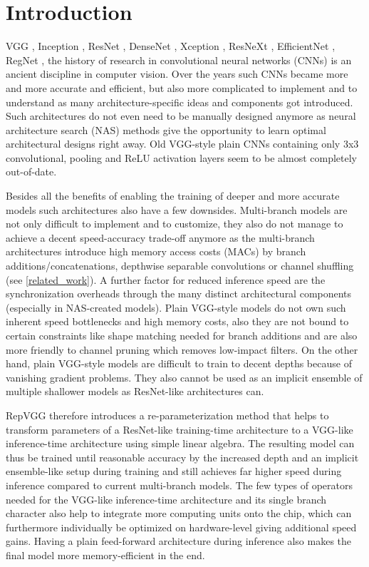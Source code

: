 \section{Introduction} \label{introduction}

VGG \cite{KarenSimonyan.2014}, Inception \cite{ChristianSzegedy.2014}, ResNet \cite{KaimingHe.2015}, DenseNet \cite{GaoHuang.2016}, Xception \cite{FrancoisChollet.2017}, ResNeXt \cite{Xie.2017}, EfficientNet \cite{LeMingxingTan.2019}, RegNet \cite{IlijaRadosavovic.2020}, the history of research in convolutional neural networks (CNNs) is an ancient discipline in computer vision. Over the years such CNNs became more and more accurate and efficient, but also more complicated to implement and to understand as many architecture-specific ideas and components got introduced. Such architectures do not even need to be manually designed anymore as neural architecture search (NAS) methods give the opportunity to learn optimal architectural designs right away. Old VGG-style plain CNNs containing only 3x3 convolutional, pooling and ReLU activation layers seem to be almost completely out-of-date. 

Besides all the benefits of enabling the training of deeper and more accurate models such architectures also have a few downsides. Multi-branch models are not only difficult to implement and to customize, they also do not manage to achieve a decent speed-accuracy trade-off anymore as the multi-branch architectures introduce high memory access costs (MACs) by branch additions/concatenations, depthwise separable convolutions or channel shuffling (see \autoref{related_work}). A further factor for reduced inference speed are the synchronization overheads through the many distinct architectural components (especially in NAS-created models). Plain VGG-style models do not own such inherent speed bottlenecks and high memory costs, also they are not bound to certain constraints like shape matching needed for branch additions and are also more friendly to channel pruning \cite{Li.2017} which removes low-impact filters. On the other hand, plain VGG-style models are difficult to train to decent depths because of vanishing gradient problems. They also cannot be used as an implicit ensemble of multiple shallower models as ResNet-like architectures can. 

RepVGG therefore introduces a re-parameterization method that helps to transform parameters of a ResNet-like training-time architecture to a VGG-like inference-time architecture using simple linear algebra. The resulting model can thus be trained until reasonable accuracy by the increased depth and an implicit ensemble-like setup during training and still achieves far higher speed during inference compared to current multi-branch models. The few types of operators needed for the VGG-like inference-time architecture and its single branch character also help to integrate more computing units onto the chip, which can furthermore individually be optimized on hardware-level giving additional speed gains. Having a plain feed-forward architecture during inference also makes the final model more memory-efficient in the end. 


